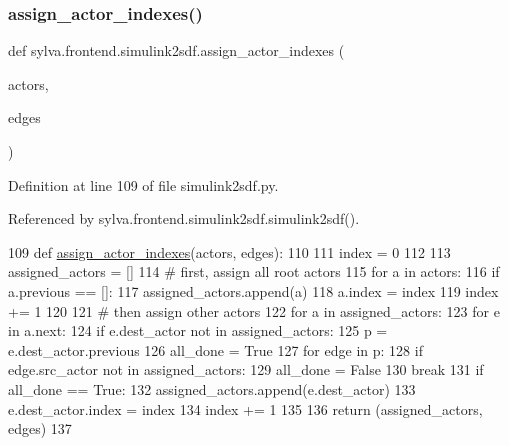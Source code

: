 \subsubsection{\texorpdfstring{assign\+\_\+actor\+\_\+indexes()}{assign\_actor\_indexes()}}
{\footnotesize\ttfamily def sylva.\+frontend.\+simulink2sdf.\+assign\+\_\+actor\+\_\+indexes (\begin{DoxyParamCaption}\item[{}]{actors,  }\item[{}]{edges }\end{DoxyParamCaption})}



Definition at line 109 of file simulink2sdf.\+py.



Referenced by sylva.\+frontend.\+simulink2sdf.\+simulink2sdf().


\begin{DoxyCode}
109 \textcolor{keyword}{def }\hyperlink{namespacesylva_1_1frontend_1_1simulink2sdf_aa4a670a2c40a40dfb700426677bcb657}{assign\_actor\_indexes}(actors, edges):
110 
111     index = 0
112 
113     assigned\_actors = []
114     \textcolor{comment}{# first, assign all root actors}
115     \textcolor{keywordflow}{for} a \textcolor{keywordflow}{in} actors:
116         \textcolor{keywordflow}{if} a.previous == []:
117             assigned\_actors.append(a)
118             a.index = index
119             index += 1
120 
121     \textcolor{comment}{# then assign other actors}
122     \textcolor{keywordflow}{for} a \textcolor{keywordflow}{in} assigned\_actors:
123         \textcolor{keywordflow}{for} e \textcolor{keywordflow}{in} a.next:
124             \textcolor{keywordflow}{if} e.dest\_actor \textcolor{keywordflow}{not} \textcolor{keywordflow}{in} assigned\_actors:
125                 p = e.dest\_actor.previous
126                 all\_done = \textcolor{keyword}{True}
127                 \textcolor{keywordflow}{for} edge \textcolor{keywordflow}{in} p:
128                     \textcolor{keywordflow}{if} edge.src\_actor \textcolor{keywordflow}{not} \textcolor{keywordflow}{in} assigned\_actors:
129                         all\_done = \textcolor{keyword}{False}
130                         \textcolor{keywordflow}{break}
131                 \textcolor{keywordflow}{if} all\_done == \textcolor{keyword}{True}:
132                     assigned\_actors.append(e.dest\_actor)
133                     e.dest\_actor.index = index
134                     index += 1
135 
136     \textcolor{keywordflow}{return} (assigned\_actors, edges)
137 \end{DoxyCode}
\mbox{\label{namespacesylva_1_1frontend_1_1simulink2sdf_a67a8c32527e5a89c1ec67fcd17a9da74}} 
